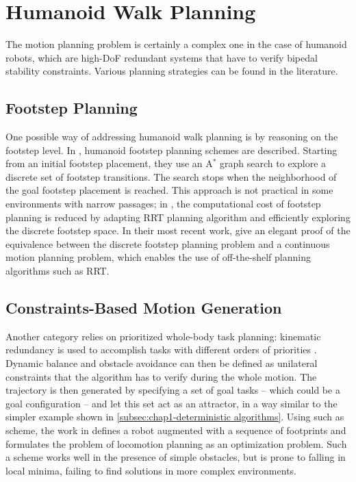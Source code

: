 \section{Humanoid Walk Planning}
\label{sec:chap1-humanoid-walk-planning}

The motion planning problem is certainly a complex one in the case of
humanoid robots, which are high-DoF redundant systems that have to
verify bipedal stability constraints. Various planning strategies can
be found in the literature.

\subsection{Footstep Planning}
\label{subsec:chap1-footstep-planning}

One possible way of addressing humanoid walk planning is by reasoning
on the footstep level. In \cite{kuff01,ches05}, humanoid footstep
planning schemes are described. Starting from an initial footstep
placement, they use an A$^{*}$ graph search \cite{hart68} to explore a
discrete set of footstep transitions. The search stops when the
neighborhood of the goal footstep placement is reached. This approach
is not practical in some environments with narrow passages; in
\cite{xia09, perr11a}, the computational cost of footstep planning is
reduced by adapting RRT planning algorithm and efficiently exploring
the discrete footstep space. In their most recent work, \cite{perr11b,
  perr12} give an elegant proof of the equivalence between the
discrete footstep planning problem and a continuous motion planning
problem, which enables the use of off-the-shelf planning algorithms
such as RRT.

\subsection{Constraints-Based Motion Generation}
\label{subsec:chap1-constraints-motion-generation}

Another category relies on prioritized whole-body task planning:
kinematic redundancy is used to accomplish tasks with different orders
of priorities \cite{khatib2004wbd, saab-tro-12}. Dynamic balance and
obstacle avoidance can then be defined as unilateral constraints that
the algorithm has to verify during the whole motion. The trajectory is
then generated by specifying a set of goal tasks -- which could be a
goal configuration -- and let this set act as an attractor, in a way
similar to the simpler example shown in
\ref{subsec:chap1-deterministic algorithms}. Using such as scheme, the
work in \cite{kano09} defines a robot augmented with a sequence of
footprints and formulates the problem of locomotion planning as an
optimization problem. Such a scheme works well in the presence of
simple obstacles, but is prone to falling in local minima, failing to
find solutions in more complex environments.

